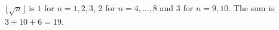 $\lfloor\sqrt n\rfloor$ is $1$ for $n=1,2,3$, $2$ for $n=4,\dots,8$ and $3$ for $n=9,10$. The sum is $3+10+6=\boxed{19}$.
